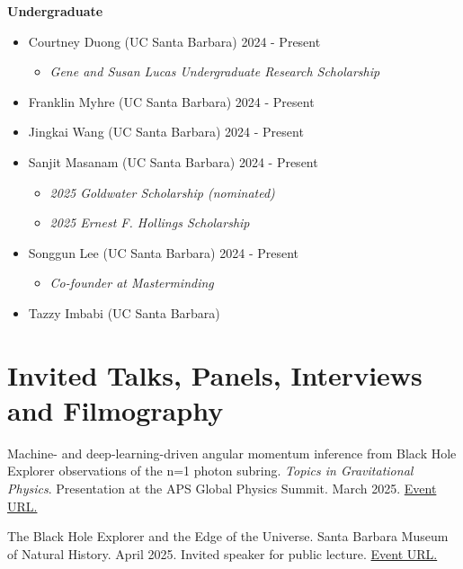 \documentclass[margin,line]{res}
\begin{document}
\begin{resume}
\textbf{Undergraduate}
\begin{itemize}
    \item[] Courtney Duong (UC Santa Barbara) \hfill 2024 - Present
    \begin{itemize}
        \item[] \textit{Gene and Susan Lucas Undergraduate Research Scholarship}
    \end{itemize}
    \item[] Franklin Myhre (UC Santa Barbara) \hfill 2024 - Present
    \item[] Jingkai Wang (UC Santa Barbara) \hfill 2024 - Present
    \item[] Sanjit Masanam (UC Santa Barbara) \hfill 2024 - Present
    \begin{itemize}
        \item[] \textit{2025 Goldwater Scholarship (nominated)}
        \item[] \textit{2025 Ernest F. Hollings Scholarship}
    \end{itemize}
    \item[] Songgun Lee (UC Santa Barbara) \hfill 2024 - Present
    \begin{itemize}
        \item[] \textit{Co-founder at Masterminding}
    \end{itemize}
    \item[] Tazzy Imbabi (UC Santa Barbara)
\end{itemize}


\vspace{+.4cm}
\section{\sc Invited Talks, Panels, Interviews and Filmography}

Machine- and deep-learning-driven angular momentum inference from Black Hole Explorer observations of the n=1 photon subring. \textit{Topics in Gravitational Physics}. Presentation at the APS Global Physics Summit. March 2025. {\color{blue}\href{https://summit.aps.org/events/APR-C20/8}{Event URL.}}

The Black Hole Explorer and the Edge of the Universe. Santa Barbara Museum of Natural History. April 2025. Invited speaker for public lecture. {\color{blue}\href{https://www.sbnature.org/visit/calendar/8642/the-black-hole-explorer-and-the-edge-of-the-universe}{Event URL.}}


\end{resume}
\end{document}
